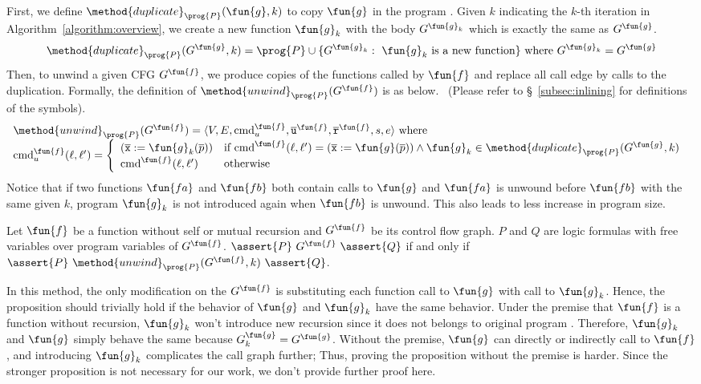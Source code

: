 First, we define $\method{duplicate}_\prog{P}(\fun{g}, k)$ to copy $\fun{g}$ in
the program .
Given $k$ indicating the $k$-th iteration in Algorithm~\ref{algorithm:overview},
we create a new function $\fun{g}_k$ with the body $G^{\fun{g}_k}$ which is
exactly the same as $G^\fun{g}$.
\[
  \method{duplicate}_\prog{P}(G^\fun{g}, k)
    = \prog{P}\cup\{G^{\fun{g}_k}:\text{ $\fun{g}_k$ is a new function}\} \text{ where }
    G^{\fun{g}_k} = G^\fun{g}
\]
Then, to unwind a given CFG $G^\fun{f}$, we produce copies of the functions
called by $\fun{f}$ and replace all call edge by calls to the duplication.
Formally, the definition of $\method{unwind}_\prog{P}(G^\fun{f})$ is as below.
~(Please refer to \S~\ref{subsec:inlining} for definitions of the symbols).
\[
\begin{array}{l}
\method{unwind}_\prog{P}(G^\fun{f})
  = \langle V, E,\textmd{cmd}_u^\fun{f}, \overline{\texttt{u}}^\fun{f}, \overline{\texttt{r}}^\fun{f},s,e \rangle \text{ where} \\
  
\textmd{cmd}_u^\fun{f} (\ell, \ell') =
\left\{
  \begin{array}{ll}
  (\overline{\texttt{x}}:=\fun{g}_k(\overline{p})) &\text{if } 
    \textmd{cmd}^\fun{f}(\ell,\ell')=(\overline{\texttt{x}}:=\fun{g}(\overline{p}))
    \land \fun{g}_k \in \method{duplicate}_\prog{P}(G^\fun{g}, k)\\
  \textmd{cmd}^\fun{f}(\ell,\ell') &\text{otherwise}
  \end{array}
\right.
\
\end{array}
\]
Notice that if two functions $\fun{fa}$ and $\fun{fb}$ both contain calls to $\fun{g}$
and $\fun{fa}$ is unwound before $\fun{fb}$ with the same given $k$, 
program $\fun{g}_k$ is not introduced again when $\fun{fb}$ is unwound.
This also leads to less increase in program size.

\begin{proposition}
  Let $\fun{f}$ be a function without self or mutual recursion and 
  $G^\fun{f}$ be its control flow graph.
  $P$ and $Q$ are logic formulas with free variables over program variables of
  $G^\fun{f}$.
  $\assert{P}\ G^\fun{f}\ \assert{Q}$ if and only if 
  $\assert{P}\ \method{unwind}_\prog{P}(G^\fun{f}, k)\ \assert{Q}$.
\end{proposition}
In this method, the only modification on the $G^\fun{f}$ is substituting each
function call to $\fun{g}$ with call to $\fun{g}_k$.
Hence, the proposition should trivially hold if the behavior of $\fun{g}$ and
$\fun{g}_k$ have the same behavior.
Under the premise that $\fun{f}$ is a function without recursion,
$\fun{g}_k$ won't introduce new recursion since it does not belongs to original
program \prog{P}.
Therefore, $\fun{g}_k$ and $\fun{g}$ simply behave the same because 
$G^\fun{g}_k = G^\fun{g}$.
Without the premise, $\fun{g}$ can directly or indirectly call to $\fun{f}$,
and introducing $\fun{g}_k$ complicates the call graph further;
Thus, proving the proposition without the premise is harder.
Since the stronger proposition is not necessary for our work,
we don't provide further proof here.

